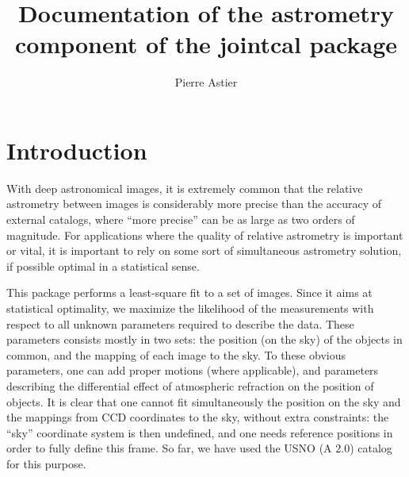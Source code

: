 \documentclass[a4paper,12pt]{scrartcl}
\title{Documentation of the astrometry component of the jointcal package}
\author{Pierre Astier}
\affil{LPNHE/IN2P3/CNRS (Paris)}
\begin{document}
\maketitle




\tableofcontents

\section{Introduction}
With deep astronomical images, it is extremely common that
the relative astrometry between images is considerably more precise
than the accuracy of external catalogs, where ``more precise'' can be as large
as two orders of magnitude. For applications where the
quality of relative astrometry is important or vital, it is important
to rely on some sort of simultaneous astrometry solution, if possible
optimal in a statistical sense. 

This package performs a least-square fit to a set of images.
Since it aims at statistical optimality, we maximize 
the likelihood of the measurements with respect to all 
unknown parameters required to describe the data.
These parameters consists mostly in two sets: the position
(on the sky) of the objects in common, and the mapping
of each image to the sky. To these obvious parameters,
one can add proper motions (where applicable), and 
parameters describing the differential effect of atmospheric refraction
on the position of objects. It is clear that one cannot
fit simultaneously the position on the sky and the mappings
from CCD coordinates to the sky, without extra constraints:
the ``sky'' coordinate system is then undefined, and one needs
reference positions in order to fully define this frame.
So far, we have used the USNO (A 2.0) catalog for this purpose.
\end{document}
